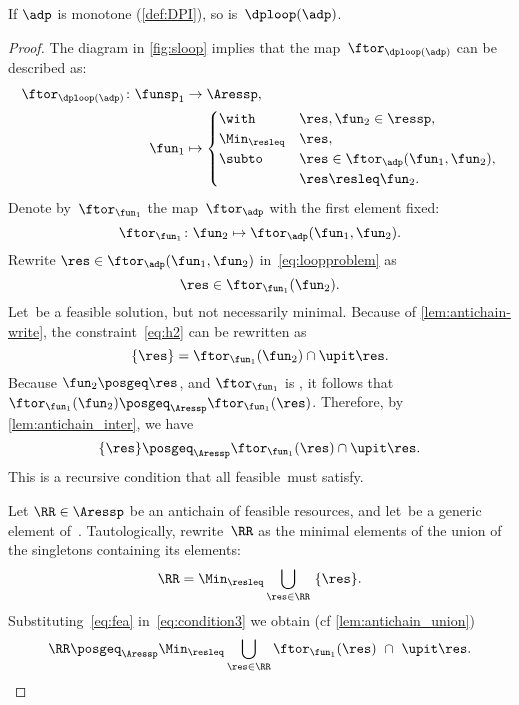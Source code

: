 \begin{proposition}
    \label{prop:loop-continuous}If $\adp$ is monotone (\cref{def:DPI}),
    so is~$\dploop(\adp)$.
\end{proposition}
\begin{proof}
    The diagram in \cref{fig:sloop} implies that the map~$\ftor_{\dploop(\adp)}$
    can be described as:
    \begin{align}
        \ftor_{\dploop(\adp)}\colon\funsp_{1} & \to\Aressp,\label{eq:loopproblem}\\
        \fun_{1} & \mapsto\begin{cases}
                              \with & \res,\fun_{2}\in\ressp,\\
                              \Min_{\resleq} & \res,\\
                              \subto & \res\in\ftor_{\adp}(\fun_{1},\fun_{2}),\\
                              & \res\resleq\fun_{2}.
        \end{cases}
    \end{align}
    Denote by~$\ftor_{\fun_{1}}$ the map~$\ftor_{\adp}$ with the
    first element fixed:
    \begin{equation*}
        \ftor_{\fun_{1}}\colon\fun_{2}\mapsto\ftor_{\adp}(\fun_{1},\fun_{2}).
    \end{equation*}
    Rewrite $\res\in\ftor_{\adp}(\fun_{1},\fun_{2})$ in~\cref{eq:loopproblem}
    as
    \begin{equation}
        \res\in\ftor_{\fun_{1}}(\fun_{2}).\label{eq:h2}
    \end{equation}
    Let~\res be a feasible solution, but not necessarily minimal.
    Because of \cref{lem:antichain-write}, the constraint~\cref{eq:h2} can
    be rewritten as
    \begin{equation}
        \{\res\}=\ftor_{\fun_{1}}(\fun_{2})\cap\upit\res.\label{eq:h3}
    \end{equation}
    Because $\fun_{2}\posgeq\res$, and $\ftor_{\fun_{1}}$ is \scottcontinuous,
    it follows that~$\ftor_{\fun_{1}}(\fun_{2})\posgeq_{\Aressp}\ftor_{\fun_{1}}(\res)$.
    Therefore, by \cref{lem:antichain_inter}, we have
    \begin{equation}
        \{\res\}\posgeq_{\Aressp}\ftor_{\fun_{1}}(\res)\cap\upit\res.\label{eq:fea}
    \end{equation}
    This is a recursive condition that all feasible~\res must satisfy.

    Let $\RR\in\Aressp$ be an antichain of feasible resources, and
    let~\res be a generic element of~\ressp. Tautologically, rewrite~$\RR$
    as the minimal elements of the union of the singletons containing
    its elements:
    \begin{equation}
        \RR=\Min_{\resleq}\bigcup_{\res\in\RR}\ \{\res\}.\label{eq:condition3}
    \end{equation}
    Substituting~\cref{eq:fea} in~\cref{eq:condition3} we obtain (cf
    \cref{lem:antichain_union})
    \begin{equation}
        \RR\posgeq_{\Aressp}\Min_{\resleq}\bigcup_{\res\in\RR}\ftor_{\fun_{1}}(\res)\ \cap\ \upit\res.\label{eq:recursive}
    \end{equation}


\end{proof}
